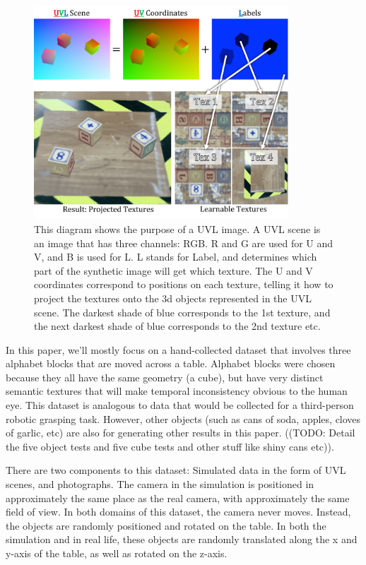 \documentclass{article}
\begin{document}
\begin{figure}[H]
	\begin{center}
		\includegraphics[width=270pt]{../images/uvl_explanation.pdf}
	\end{center}
	\caption{
		This diagram shows the purpose of a UVL image.
		A UVL scene is an image that has three channels: RGB.
		R and G are used for U and V, and B is used for L.
		L stands for Label, and determines which part of the synthetic image will get which texture.
		The U and V coordinates correspond to positions on each texture,
		telling it how to project the textures onto the 3d objects represented in the UVL scene.
		The darkest shade of blue corresponds to the 1st texture, and the next darkest shade of blue corresponds to the 2nd texture etc.
		}
	\label{fig:uvl_explanation}
\end{figure}



In this paper, we'll mostly focus on a hand-collected dataset that involves three alphabet blocks that are moved across a table.
Alphabet blocks were chosen because they all have the same geometry (a cube), but have very distinct semantic textures that will make temporal inconsistency obvious to the human eye.
This dataset is analogous to data that would be collected for a third-person robotic grasping task.
However, other objects (such as cans of soda, apples, cloves of garlic, etc) are also for generating other results in this paper. ((TODO: Detail the five object tests and five cube tests and other stuff like shiny cans etc)).

There are two components to this dataset: Simulated data in the form of UVL scenes, and photographs.
The camera in the simulation is positioned in approximately the same place as the real camera, with approximately the same field of view.
In both domains of this dataset, the camera never moves. Instead, the objects are randomly positioned and rotated on the table.
In both the simulation and in real life, these objects are randomly translated along the x and y-axis of the table, as well as rotated on the z-axis.
\end{document}
